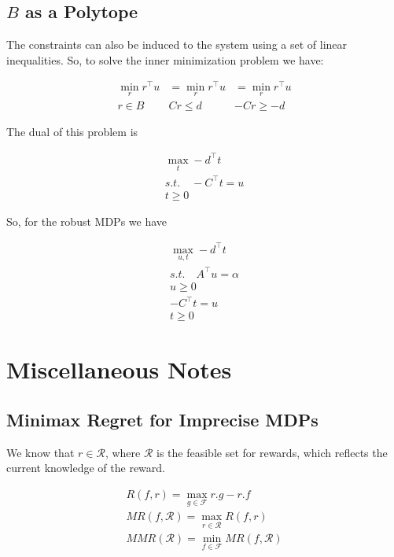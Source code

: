 \documentclass{article}
\theoremstyle{remark}
\theoremstyle{remark}
\theoremstyle{remark}
\theoremstyle{remark}
\theoremstyle{remark}
\theoremstyle{remark}
\begin{document}
\subsection*{$B$ as a Polytope}

The constraints can also be induced to the system using a set of linear inequalities. So, to solve the inner minimization problem we have:

$$
    \begin{matrix}
        \min_r r^\top  u  &= \min_r r^\top  u  & = \min_r r^\top  u \\
        r \in B & Cr \leq d & -Cr \geq -d
    \end{matrix}
$$

The dual of this problem is

$$
  \begin{matrix}
    \max_t -d^\top t \\
    s.t. \quad -C^\top t = u \\
    t \geq 0
  \end{matrix}
$$

So, for the robust MDPs we have

$$
  \begin{matrix}
    \max_{u,t} -d^\top t \\
    s.t. \quad A^\top  u = \alpha \\
    u \geq 0 \\
    -C^\top t = u \\
    t \geq 0
  \end{matrix}
$$


\section*{Miscellaneous Notes}

\subsection*{Minimax Regret for Imprecise MDPs}


We know that $r \in \mathcal{R}$, where $\mathcal{R}$ is the feasible set for rewards, which reflects the current knowledge of the reward.


$$
  \begin{matrix}
    R(f,r) = \max_{g \in \mathcal{F}} r.g - r.f \\
    MR(f,\mathcal{R}) = \max_{r \in \mathcal{R}} R(f,r) \\
    MMR(\mathcal{R}) = \min_{f \in \mathcal{F}} MR(f, \mathcal{R})
  \end{matrix}
$$
\end{document}
